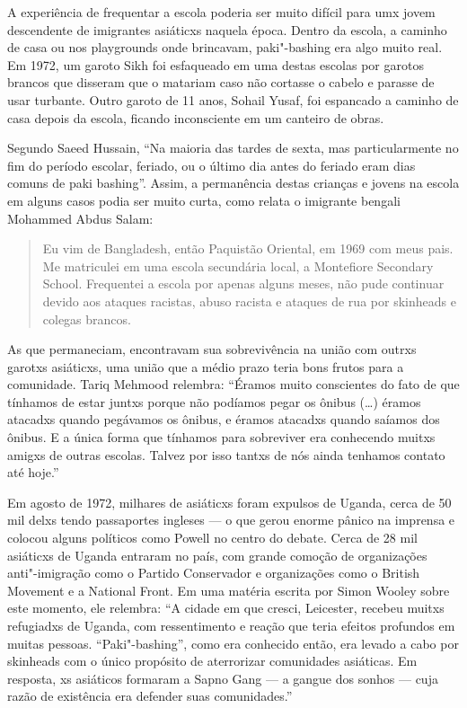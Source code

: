 A experiência de frequentar a escola poderia ser muito difícil para umx jovem descendente de imigrantes asiáticxs naquela época. Dentro da escola, a caminho de casa ou nos playgrounds onde brincavam, paki"-bashing era algo muito real. Em 1972, um garoto Sikh foi esfaqueado em uma destas escolas por garotos brancos que disseram que o matariam caso não cortasse o cabelo e parasse de usar turbante. Outro garoto de 11 anos, Sohail Yusaf, foi espancado a caminho de casa depois da escola, ficando inconsciente em um canteiro de obras.

Segundo Saeed Hussain, ``Na maioria das tardes de sexta, mas particularmente no fim do período escolar, feriado, ou o último dia antes do feriado eram dias comuns de paki bashing''. Assim, a permanência destas crianças e jovens na escola em alguns casos podia ser muito curta, como relata o imigrante bengali Mohammed Abdus Salam:

\begin{quote}
Eu vim de Bangladesh, então Paquistão Oriental, em 1969 com meus pais. Me matriculei em uma escola secundária local, a Montefiore Secondary School. Frequentei a escola por apenas alguns meses, não pude continuar devido aos ataques racistas, abuso racista e ataques de rua por skinheads e colegas brancos.
\end{quote}

As que permaneciam, encontravam sua sobrevivência na união com outrxs garotxs asiáticxs, uma união que a médio prazo teria bons frutos para a comunidade. Tariq Mehmood relembra: ``Éramos muito conscientes do fato de que tínhamos de estar juntxs porque não podíamos pegar os ônibus (\ldots{}) éramos atacadxs quando pegávamos os ônibus, e éramos atacadxs quando saíamos dos ônibus. E a única forma que tínhamos para sobreviver era conhecendo muitxs amigxs de outras escolas. Talvez por isso tantxs de nós ainda tenhamos contato até hoje.''

Em agosto de 1972, milhares de asiáticxs foram expulsos de Uganda, cerca de 50 mil delxs tendo passaportes ingleses --- o que gerou enorme pânico na imprensa e colocou alguns políticos como Powell no centro do debate. Cerca de 28 mil asiáticxs de Uganda entraram no país, com grande comoção de organizações anti"-imigração como o Partido Conservador e organizações como o British Movement e a National Front. Em uma matéria escrita por Simon Wooley sobre este momento, ele relembra: ``A cidade em que cresci, Leicester, recebeu muitxs refugiadxs de Uganda, com ressentimento e reação que teria efeitos profundos em muitas pessoas. ``Paki"-bashing'', como era conhecido então, era levado a cabo por skinheads com o único propósito de aterrorizar comunidades asiáticas. Em resposta, xs asiáticos formaram a Sapno Gang --- a gangue dos sonhos --- cuja razão de existência era defender suas comunidades.''

